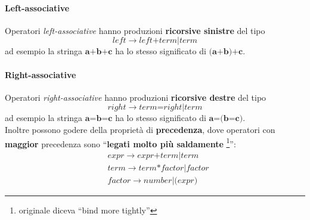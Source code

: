 \paragraph{Left-associative}
Operatori \textit{left-associative} hanno produzioni \textbf{ricorsive sinistre}
del tipo $$left \to left \textbf{+} term | term$$ ad esempio la stringa
$\textbf{a+b+c}$ ha lo stesso significato di $\textbf{(a+b)+c}$.

\paragraph{Right-associative}
Operatori \textit{right-associative} hanno produzioni \textbf{ricorsive destre}
del tipo $$right \to term \textbf{=} right | term$$ ad esempio la stringa
$\textbf{a=b=c}$ ha lo stesso significato di $\textbf{a=(b=c)}$. \\

Inoltre possono godere della proprietà di \textbf{precedenza}, dove operatori
con \textbf{maggior} precedenza sono ``\textbf{legati molto più saldamente}
\footnote{originale diceva ``bind more tightly''}'':
\begin{align*}
& expr \to expr\textbf{+}term|term \\
& term \to term\textbf{*}factor|factor \\
& factor \to number|\textbf{(}expr\textbf{)}
\end{align*}
